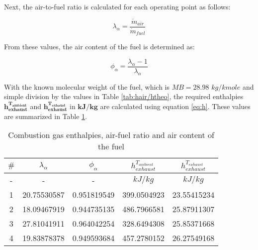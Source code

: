 \documentclass{report}
\begin{document}
Next, the air-to-fuel ratio is calculated for each operating point as follows:

$$\lambda_{\alpha}=\frac{\dot{m}_{air}}{\dot{m}_{fuel}}$$

From these values, the air content of the fuel is determined as:

$$\phi_{\alpha}=\frac{\lambda_{\alpha}-1}{\lambda_{\alpha}}$$

With the known molecular weight of the fuel, which is $MB=28.98$ $kg/kmole$ and simple division by the values in Table \ref{tab:hair/htheo}, the required enthalpies $\boldsymbol{h^{T_{ambient}}_{exhaust}}$ and $\boldsymbol{h^{T_{exhaust}}_{exhaust}}$ in $\boldsymbol{kJ/kg}$ are calculated using equation \ref{eq:h}. These values are summarized in Table \ref{tab:l/phi/h}.

\begin{table}[!h] 
\centering  
\renewcommand{\arraystretch}{1.2}  
\begin{tabular}{|c|c|c|c|c|}
\hline 
\rowcolor{blue} $\#$ & $\lambda_{\alpha}$ & $\phi_{\alpha}$ & $h^{T_{ambient}}_{exhaust}$ & $h^{T_{exhaust}}_{exhaust}$\\ 
\hline 
\rowcolor{gray} - & - & - & $kJ/kg$ & $kJ/kg$\\ 
\hline 1 &  20.75530587 & 0.951819549 & 399.0504923 & 23.55415234\\ 
\hline 2 & 18.09467919 & 0.944735135 & 486.7966581	& 25.87911307\\ 
\hline 3 & 27.81041911 & 0.964042254 &  328.6494308 & 25.85371668\\ 
\hline 4 & 19.83878378 & 0.949593684 & 457.2780152	& 26.27549168\\ 
\hline  
\end{tabular} 
\caption{Combustion gas enthalpies, air-fuel ratio and air content of the fuel}
\label{tab:l/phi/h}
\end{table}
\end{document}
